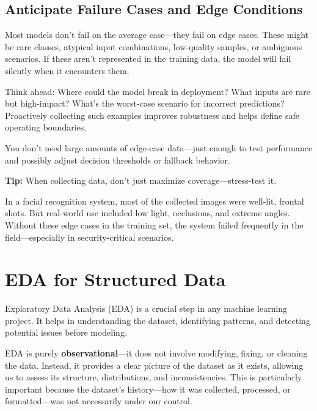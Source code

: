 \documentclass[12pt,openany, draft]{book}
\begin{document}
\section{Anticipate Failure Cases and Edge Conditions}

Most models don't fail on the average case—they fail on edge cases. These might be rare classes, atypical input combinations, low-quality samples, or ambiguous scenarios. If these aren't represented in the training data, the model will fail silently when it encounters them.

Think ahead: Where could the model break in deployment? What inputs are rare but high-impact? What’s the worst-case scenario for incorrect predictions? Proactively collecting such examples improves robustness and helps define safe operating boundaries.

You don’t need large amounts of edge-case data—just enough to test performance and possibly adjust decision thresholds or fallback behavior.

\textbf{Tip:} When collecting data, don’t just maximize coverage—stress-test it.

\begin{examplebox}
In a facial recognition system, most of the collected images were well-lit, frontal shots. But real-world use included low light, occlusions, and extreme angles. Without these edge cases in the training set, the system failed frequently in the field—especially in security-critical scenarios.
\end{examplebox}




\chapter{EDA for Structured Data}

Exploratory Data Analysis (EDA) is a crucial step in any machine learning 
project. It helps in understanding the dataset, identifying patterns, and 
detecting potential issues before modeling. \newline

EDA is purely \textbf{observational}—it does not involve modifying, fixing, 
or cleaning the data. Instead, it provides a clear picture of the dataset 
as it exists, allowing us to assess its structure, distributions, and 
inconsistencies. This is particularly important because the dataset’s 
history—how it was collected, processed, or formatted—was not necessarily 
under our control. \newline
\end{document}
